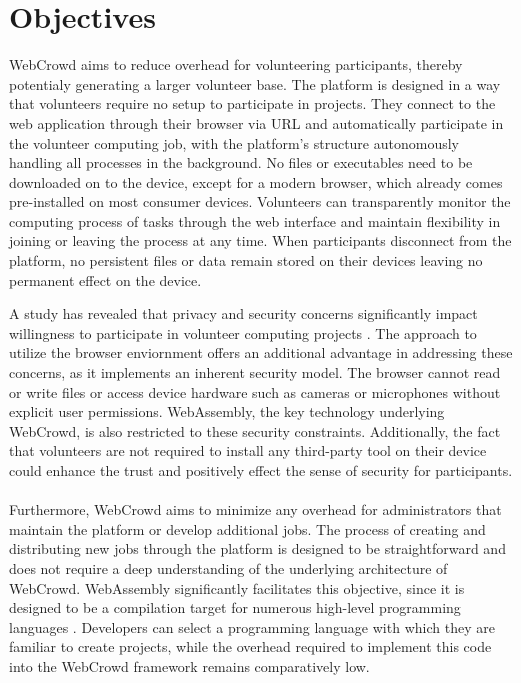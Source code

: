 \section{Objectives}
\label{sec:intro:objectives}
WebCrowd aims to reduce overhead for volunteering participants, thereby potentialy generating a larger volunteer base. The platform is designed in a way that volunteers require no setup to participate in projects. They connect to the web application through their browser via \acs{URL} and automatically participate in the volunteer computing job, with the platform's structure autonomously handling all processes in the background. No files or executables need to be downloaded on to the device, except for a modern browser, which already comes pre-installed on most consumer devices. Volunteers can transparently monitor the computing process of tasks through the web interface and maintain flexibility in joining or leaving the process at any time. When participants disconnect from the platform, no persistent files or data remain stored on their devices leaving no permanent effect on the device.

A study has revealed that privacy and security concerns significantly impact willingness to participate in volunteer computing projects \cite{intro:volunteerStudy}. The approach to utilize the browser enviornment offers an additional advantage in addressing these concerns, as it implements an inherent security model. The browser cannot read or write files or access device hardware such as cameras or microphones without explicit user permissions. WebAssembly, the key technology underlying WebCrowd, is also restricted to these security constraints. Additionally, the fact that volunteers are not required to install any third-party tool on their device could enhance the trust and positively effect the sense of security for participants.
\\~\\
Furthermore, WebCrowd aims to minimize any overhead for administrators that maintain the platform or develop additional jobs. The process of creating and distributing new jobs through the platform is designed to be straightforward and does not require a deep understanding of the underlying architecture of WebCrowd. WebAssembly significantly facilitates this objective, since it is designed to be a compilation target for numerous high-level programming languages \cite{methodology:wasm,methodology:wasmdocu, relatedwork:wasmedgecomputing}. Developers can select a programming language with which they are familiar to create projects, while the overhead required to implement this code into the WebCrowd framework remains comparatively low. 

